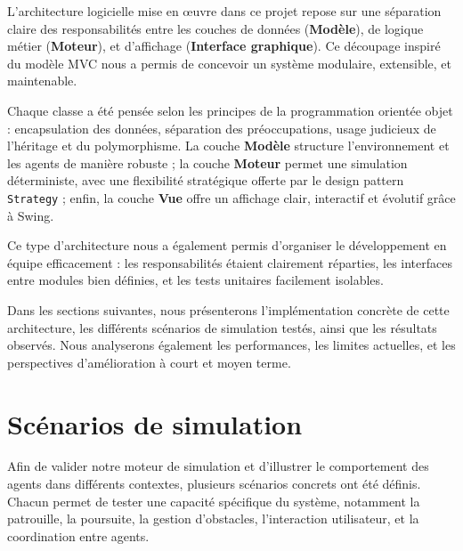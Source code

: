 L’architecture logicielle mise en œuvre dans ce projet repose sur une séparation claire des responsabilités entre les couches de données (\textbf{Modèle}), de logique métier (\textbf{Moteur}), et d’affichage (\textbf{Interface graphique}). Ce découpage inspiré du modèle MVC nous a permis de concevoir un système modulaire, extensible, et maintenable.

Chaque classe a été pensée selon les principes de la programmation orientée objet : encapsulation des données, séparation des préoccupations, usage judicieux de l’héritage et du polymorphisme. La couche \textbf{Modèle} structure l’environnement et les agents de manière robuste ; la couche \textbf{Moteur} permet une simulation déterministe, avec une flexibilité stratégique offerte par le design pattern \texttt{Strategy} ; enfin, la couche \textbf{Vue} offre un affichage clair, interactif et évolutif grâce à Swing.

Ce type d’architecture nous a également permis d’organiser le développement en équipe efficacement : les responsabilités étaient clairement réparties, les interfaces entre modules bien définies, et les tests unitaires facilement isolables.

Dans les sections suivantes, nous présenterons l’implémentation concrète de cette architecture, les différents scénarios de simulation testés, ainsi que les résultats observés. Nous analyserons également les performances, les limites actuelles, et les perspectives d’amélioration à court et moyen terme.
\section{Scénarios de simulation}

Afin de valider notre moteur de simulation et d’illustrer le comportement des agents dans différents contextes, plusieurs scénarios concrets ont été définis. Chacun permet de tester une capacité spécifique du système, notamment la patrouille, la poursuite, la gestion d’obstacles, l’interaction utilisateur, et la coordination entre agents.
